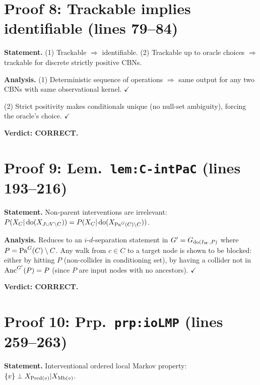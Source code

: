\documentclass{article}
\begin{document}
\section{Proof 8: Trackable implies identifiable (lines 79--84)}

\textbf{Statement.} (1) Trackable $\Rightarrow$ identifiable.
(2) Trackable up to oracle choices $\Rightarrow$ trackable for discrete
strictly positive CBNs.

\textbf{Analysis.}
(1) Deterministic sequence of operations $\Rightarrow$ same output for any two
CBNs with same observational kernel.  $\checkmark$

(2) Strict positivity makes conditionals unique (no null-set ambiguity),
forcing the oracle's choice.  $\checkmark$

\textbf{Verdict: CORRECT.}

\section{Proof 9: Lem.\ \texttt{lem:C-intPaC} (lines 193--216)}

\textbf{Statement.} Non-parent interventions are irrelevant:
$P(X_C|\operatorname{do}(X_{J\cup V\setminus C})) = P(X_C|\operatorname{do}(X_{\mathrm{Pa}^G(C)\setminus C}))$.

\textbf{Analysis.}
Reduces to an $i$-$d$-separation statement in $G'=G_{\operatorname{do}(I_W,P)}$ where
$P=\mathrm{Pa}^G(C)\setminus C$.  Any walk from $c\in C$ to a target node is shown
to be blocked: either by hitting $P$ (non-collider in conditioning set),
by having a collider not in $\mathrm{Anc}^{G'}(P)=P$ (since $P$ are input nodes with
no ancestors).  $\checkmark$

\textbf{Verdict: CORRECT.}

\section{Proof 10: Prp.\ \texttt{prp:ioLMP} (lines 259--263)}

\textbf{Statement.} Interventional ordered local Markov property:
$\{v\}\perp X_{\mathrm{Pred}(v)} | X_{\mathrm{Mb}(v)}$.
\end{document}
